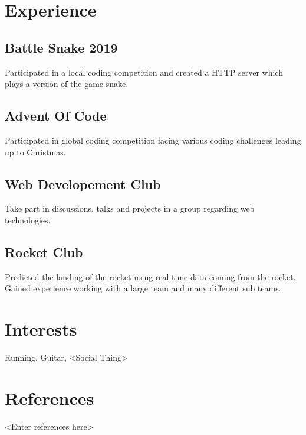 \documentclass{article}
\newcommand{\hrefColored}[3]{\href{#2}{\color{#1}{#3}}}
\begin{document}
\section{Experience}

\subsection{Battle Snake 2019 \hrefColored{blue}{https://github.com/McRaeAlex/BattleSnake2019}{github.com/McRaeAlex/BattleSnake2019}}

Participated in a local coding competition and created a HTTP server which plays
a version of the game snake.

\subsection{Advent Of Code \hrefColored{blue}{https://github.com/McRaeAlex/AdventOfCode2018}{github.com/McRaeAlex/AdventOfCode2018}}

Participated in global coding competition facing various coding challenges
leading up to Christmas.

\subsection{Web Developement Club}

Take part in discussions, talks and projects in a group regarding web 
technologies.

\subsection{Rocket Club}

Predicted the landing of the rocket using real time data coming from the rocket. 
Gained experience working with a large team and many different sub teams.

\section{Interests}

Running, Guitar, <Social Thing>

\section{References}

<Enter references here>
\end{document}

